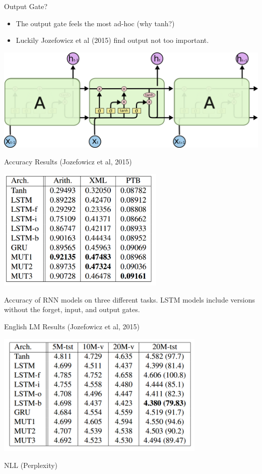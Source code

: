 \documentclass{beamer}
\begin{document}
\begin{frame}{Output Gate?}
  \begin{itemize}
  \item The output gate feels the most ad-hoc (why tanh?)
    \air 

  \item Luckily Jozefowicz et al (2015) find output not too important.
  \end{itemize}
\end{frame}

\begin{frame}
  \begin{center}
    \includegraphics[width=\textwidth]{LSTM3-chain}
  \end{center}

\end{frame}

\begin{frame}{Accuracy Results (Jozefowicz et al, 2015) }
  \begin{center}
    \includegraphics[width=8cm]{lstm-accuracy}
  \end{center}
  Accuracy of RNN models on three different tasks. LSTM models 
  include versions without the forget, input, and output gates. 
\end{frame}

\begin{frame}{English LM Results (Jozefowicz et al, 2015) }
  \begin{center}
    \includegraphics[width=10cm]{lstm-results}
  \end{center}
  \begin{center}
    NLL (Perplexity)
  \end{center}
\end{frame}
\end{document}
